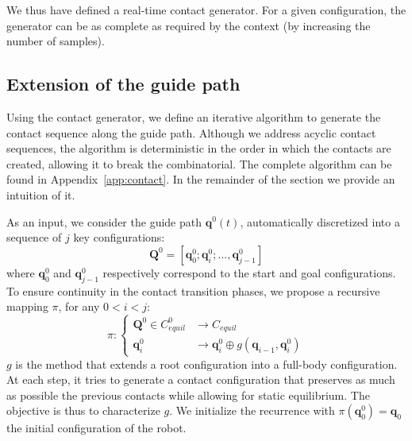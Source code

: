 We thus have defined a real-time contact generator. For a given configuration, the generator can be as complete as required by the context (by increasing the number of samples).

\subsection{Extension of the guide path}
Using the contact generator, we define an iterative algorithm to generate the contact
sequence along the guide path.
Although we address acyclic contact sequences, the algorithm is deterministic in the order in which 
the contacts are created, allowing it to break the combinatorial.
The complete algorithm can be found in Appendix~\ref{app:contact}.
In the remainder of the section we provide an intuition of it.

As an input, we consider the guide path $\mathbf{q}^0(t)$, automatically discretized into a sequence of $j$ key configurations:  
\begin{equation*}
	\mathbf{Q}^0 = [\mathbf{q}^0_{0}; \mathbf{q}^0_{i}; ..., \mathbf{q}^0_{j-1}]
\end{equation*} 
where $\mathbf{q}^0_{0}$ and $\mathbf{q}^0_{j-1}$ respectively correspond to the start and goal configurations. To ensure continuity in the contact transition phases, we propose a recursive mapping $\pi$, for any $0<i<j$:
\begin{equation*}
    \pi\colon\left\{
    \begin{aligned}		
        \mathbf{Q}^0 \in C_{equil}^0 & \longrightarrow C_{equil} \\
        \mathbf{q}^{0}_i &  \longrightarrow  \mathbf{q}^{0}_i \oplus g(\mathbf{q}_{i - 1},\mathbf{q}^{0}_i) 
    \end{aligned}
    \right.
\end{equation*} 
$g$ is the method that extends a root configuration into a full-body configuration. At each step, it tries to generate a contact configuration that preserves as much as possible
the previous contacts while allowing for static equilibrium. The objective is thus to characterize $g$.
We initialize the recurrence with $\pi(\mathbf{q}^0_{0}) = \mathbf{q}_0$ the initial configuration of the robot.


